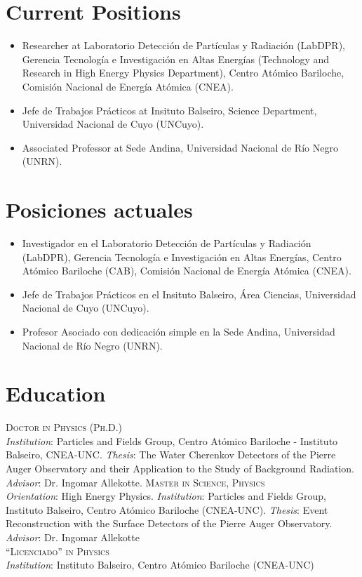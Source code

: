\ifeng
\section*{Current Positions}
\begin{itemize}
  \item Researcher at Laboratorio Detección de Partículas y Radiación (LabDPR), Gerencia Tecnología e Investigación en Altas Energías (Technology and Research in High Energy Physics Department), Centro Atómico Bariloche, Comisión Nacional de Energía Atómica (CNEA).
  \item Jefe de Trabajos Prácticos at Insituto Balseiro, Science Department, Universidad Nacional de Cuyo (UNCuyo).
  \item Associated Professor at Sede Andina, Universidad Nacional de Río Negro (UNRN).
\end{itemize}
\else
\section*{Posiciones actuales}
\begin{itemize}
\item Investigador en el Laboratorio Detección de Partículas y Radiación (LabDPR), Gerencia Tecnología e Investigación en Altas Energías, Centro Atómico Bariloche (CAB), Comisión Nacional de Energía Atómica (CNEA).
\item Jefe de Trabajos Prácticos en el Insituto Balseiro, Área Ciencias, Universidad Nacional de Cuyo (UNCuyo).
\item Profesor Asociado con dedicación simple en la Sede Andina, Universidad Nacional de Río Negro (UNRN).
\end{itemize}
\fi

\ifeng
\section*{Education}
\noindent
{}\textsc{Doctor in Physics (Ph.D.)}\\
{\emph{Institution}}: Particles and Fields Group, Centro Atómico Bariloche - Instituto Balseiro, CNEA-UNC. {\emph{Thesis}}: The Water Cherenkov Detectors of the Pierre Auger Observatory and their Application to the Study of Background Radiation. {\emph{Advisor}}: Dr. Ingomar Allekotte.
\textsc{Master in Science, Physics}\\
{\emph{Orientation}}: High Energy Physics. {\emph{Institution}}: Particles and Fields Group, Instituto Balseiro, Centro Atómico Bariloche (CNEA-UNC). {\emph{Thesis}}: Event Reconstruction with the Surface Detectors of the Pierre Auger Observatory. {\emph{Advisor}}: Dr. Ingomar Allekotte\\
\textsc{``Licenciado'' in Physics}\\
{\emph{Institution}}: Instituto Balseiro, Centro Atómico Bariloche (CNEA-UNC)\\
\else
